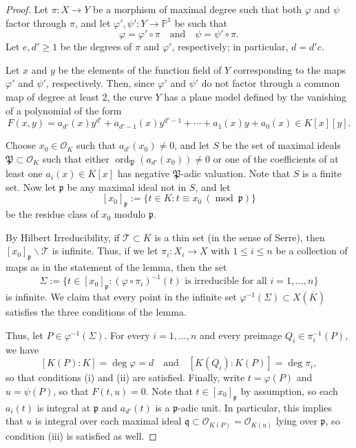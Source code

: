 \documentclass[10pt,a4paper]{amsart}
\newcommand{\Kbar}{\overline{K}}
\newcommand{\Mod}[1]{\ \left(\operatorname{mod}\ {#1}\right)}
\newcommand{\bbP}{\mathbb{P}}
\newcommand{\calO}{\mathcal{O}}
\newcommand{\calT}{\mathcal{T}}
\newcommand{\frakP}{\mathfrak{P}}
\newcommand{\frakp}{\mathfrak{p}}
\newcommand{\frakq}{\mathfrak{q}}
\newcommand{\ord}{\operatorname{ord}}
\begin{document}
\begin{proof}
Let $\pi : X \to Y$ be a morphism of maximal degree such that both $\varphi$ and $\psi$ factor through $\pi$, and let $\varphi',\psi' : Y \to \bbP^1$ be such that
    \[
        \varphi = \varphi' \circ \pi \quad\text{and}\quad \psi = \psi' \circ\pi.
    \]
Let $e, d' \ge 1$ be the degrees of $\pi$ and $\varphi'$, respectively; in particular, $d = d'e$.

Let $x$ and $y$ be the elements of the function field of $Y$ corresponding to the maps $\varphi'$ and $\psi'$, respectively. Then, since $\varphi'$ and $\psi'$ do not factor through a common map of degree at least $2$, the curve $Y$ has a plane model defined by the vanishing of a polynomial of the form
    \[
        F(x,y) = a_{d'}(x)y^{d'} + a_{d'-1}(x)y^{d'-1} + \cdots + a_1(x)y + a_0(x) \in K[x][y].
    \]

Choose $x_0 \in \calO_K$ such that $a_{d'}(x_0) \ne 0$, and let $S$ be the set of maximal ideals $\frakP \subset \calO_K$ such that either $\ord_\frakP(a_{d'}(x_0)) \ne 0$ or one of the coefficients of at least one $a_i(x) \in K[x]$ has negative $\frakP$-adic valuation. Note that $S$ is a finite set. Now let $\frakp$ be any maximal ideal not in $S$, and let
    \[
    [x_0]_\frakp := \{t \in K : t\equiv x_0 \Mod \frakp\}
    \]
be the residue class of $x_0$ modulo $\frakp$.

By Hilbert Irreducibility, if $\calT \subset K$ is a thin set (in the sense of Serre), then $[x_0]_\frakp \smallsetminus \calT$ is infinite.
Thus, if we let $\pi_i : X_i \to X$ with $1\le i \le n$ be a collection of maps as in the statement of the lemma, then the set
    \[
    \Sigma := \{t \in [x_0]_\frakp : (\varphi\circ\pi_i)^{-1}(t) \text{ is irreducible for all } i = 1,\ldots,n\}
    \]
is infinite. We claim that every point in the infinite set $\varphi^{-1}(\Sigma) \subset X(\Kbar)$ satisfies the three conditions of the lemma.

Thus, let $P \in \varphi^{-1}(\Sigma)$. For every $i = 1,\ldots,n$ and every preimage $Q_i\in\pi_i^{-1}(P)$, we have
    \[
        [K(P) : K] = \deg \varphi = d \quad\text{and}\quad [K(Q_i) : K(P)] = \deg\pi_i,
    \]
so that conditions (i) and (ii) are satisfied.
Finally, write $t = \varphi(P)$ and $u = \psi(P)$, so that $F(t,u) = 0$. Note that $t \in [x_0]_\frakp$ by assumption, so each $a_i(t)$ is integral at $\frakp$ and $a_{d'}(t)$ is a $\frakp$-adic unit. In particular, this implies that $u$ is integral over each maximal ideal $\frakq \subset \calO_{K(P)} = \calO_{K(u)}$ lying over $\frakp$, so condition (iii) is satisfied as well.
\end{proof}
\end{document}
